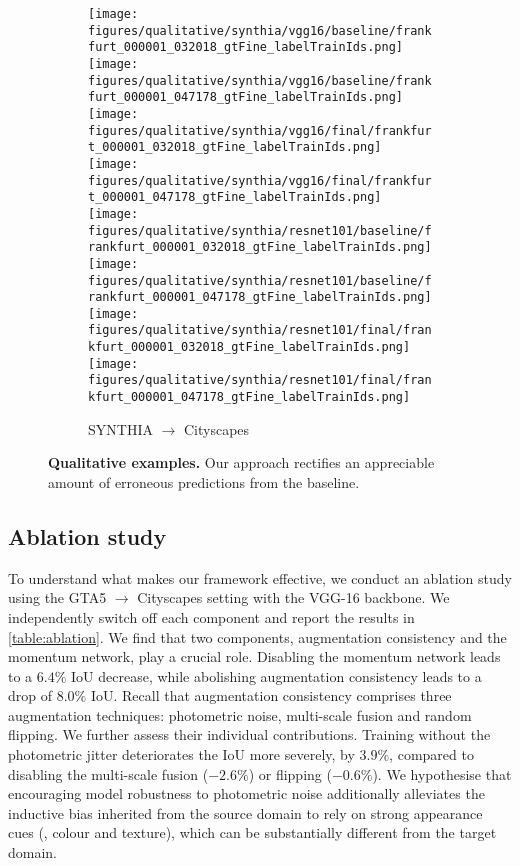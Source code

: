 \begin{figure*}[t]
\begin{subfigure}{.49\linewidth}
	\texttt{[image: figures/qualitative/synthia/vgg16/baseline/frankfurt\_000001\_032018\_gtFine\_labelTrainIds.png]}
    \texttt{[image: figures/qualitative/synthia/vgg16/baseline/frankfurt\_000001\_047178\_gtFine\_labelTrainIds.png]}\\
    \texttt{[image: figures/qualitative/synthia/vgg16/final/frankfurt\_000001\_032018\_gtFine\_labelTrainIds.png]}
    \texttt{[image: figures/qualitative/synthia/vgg16/final/frankfurt\_000001\_047178\_gtFine\_labelTrainIds.png]}\\
    \texttt{[image: figures/qualitative/synthia/resnet101/baseline/frankfurt\_000001\_032018\_gtFine\_labelTrainIds.png]}
    \texttt{[image: figures/qualitative/synthia/resnet101/baseline/frankfurt\_000001\_047178\_gtFine\_labelTrainIds.png]}\\
    \texttt{[image: figures/qualitative/synthia/resnet101/final/frankfurt\_000001\_032018\_gtFine\_labelTrainIds.png]}
    \texttt{[image: figures/qualitative/synthia/resnet101/final/frankfurt\_000001\_047178\_gtFine\_labelTrainIds.png]}
  \caption{\scriptsize SYNTHIA $\rightarrow$ Cityscapes}
\end{subfigure}
\caption{\textbf{Qualitative examples.} Our approach rectifies an appreciable amount of erroneous predictions from the baseline.}
\label{fig:qualitative}
\vspace{-0.5em}
\end{figure*}

\subsection{Ablation study}
To understand what makes our framework effective, we conduct an ablation study using the GTA5 $\rightarrow$ Cityscapes setting with the VGG-16 backbone.
We independently switch off each component and report the results in \cref{table:ablation}.
We find that two components, augmentation consistency and the momentum network, play a crucial role.
Disabling the momentum network leads to a $6.4 \%$ IoU decrease, while abolishing augmentation consistency leads to a drop of $8.0 \%$ IoU.
Recall that augmentation consistency comprises three augmentation techniques: photometric noise, multi-scale fusion and random flipping.
We further assess their individual contributions.
Training without the photometric jitter deteriorates the IoU more severely, by $3.9 \%$, compared to disabling the multi-scale fusion ($-2.6 \%$) or flipping ($-0.6 \%$).
We hypothesise that encouraging model robustness to photometric noise additionally alleviates the inductive bias inherited from the source domain to rely on strong appearance cues (\eg, colour and texture), which can be substantially different from the target domain.


